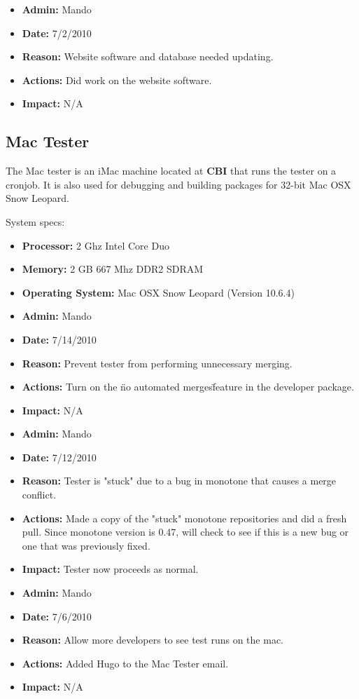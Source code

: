 \documentclass[12pt]{article}
\begin{document}
\begin{itemize}
\item[] {\bf Admin:} Mando
\item[] {\bf Date:} 7/2/2010
\item[] {\bf Reason:} Website software and database needed updating.
\item[] {\bf Actions:} Did work on the website software. 
\item[] {\bf Impact:} N/A
\end{itemize}


\subsection*{Mac Tester}

The Mac tester is an iMac machine located at {\bf CBI} that runs the tester on a cronjob. It is also used for debugging and building packages for 32-bit Mac OSX Snow Leopard.

System specs:
\begin{itemize}
\item[] {\bf Processor:} 2 Ghz Intel Core Duo
\item[] {\bf Memory:} 2 GB 667 Mhz DDR2 SDRAM
\item[] {\bf Operating System:} Mac OSX Snow Leopard (Version 10.6.4) 
\end{itemize}

\begin{itemize}
\item[] {\bf Admin:} Mando
\item[] {\bf Date:} 7/14/2010
\item[] {\bf Reason:} Prevent tester from performing unnecessary merging. 
\item[] {\bf Actions:} Turn on the \"no automated merges\" feature in the developer package.
\item[] {\bf Impact:} N/A
\end{itemize}

\begin{itemize}
\item[] {\bf Admin:} Mando
\item[] {\bf Date:} 7/12/2010
\item[] {\bf Reason:} Tester is "stuck" due to a bug in monotone that causes a merge conflict.
\item[] {\bf Actions:} Made a copy of the "stuck" monotone repositories and did a fresh pull. Since monotone version is 0.47, will check to see if this is a new bug or one that was previously fixed.
\item[] {\bf Impact:} Tester now proceeds as normal. 
\end{itemize}

\begin{itemize}
\item[] {\bf Admin:} Mando
\item[] {\bf Date:} 7/6/2010
\item[] {\bf Reason:} Allow more developers to see test runs on the mac.
\item[] {\bf Actions:} Added Hugo to the Mac Tester email.
\item[] {\bf Impact:} N/A
\end{itemize}
\end{document}
